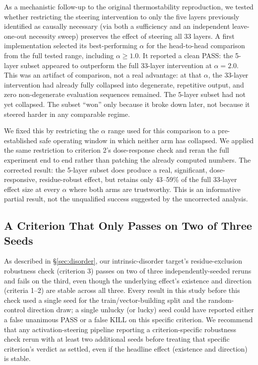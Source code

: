 \documentclass{article}
\begin{document}
As a mechanistic follow-up to the original thermostability
reproduction, we tested whether restricting the steering intervention
to only the five layers previously identified as causally necessary
(via both a sufficiency and an independent leave-one-out necessity
sweep) preserves the effect of steering all 33 layers. A first
implementation selected its best-performing $\alpha$ for the
head-to-head comparison from the full tested range, including $\alpha
\geq 1.0$. It reported a clean PASS: the 5-layer subset appeared to
outperform the full 33-layer intervention at $\alpha=2.0$. This was an
artifact of comparison, not a real advantage: at that $\alpha$, the
33-layer intervention had already fully collapsed into degenerate,
repetitive output, and zero non-degenerate evaluation sequences remained.
The 5-layer subset had not yet collapsed. The subset ``won'' only
because it broke down later, not because it steered harder in any
comparable regime.

We fixed this by restricting the $\alpha$ range used for this comparison
to a pre-established safe operating window in which neither arm has
collapsed. We applied the same restriction to criterion 2's dose-response
check and reran the full experiment end to end rather than patching the
already computed numbers. The corrected result: the 5-layer subset
does produce a real, significant, dose-responsive, residue-robust
effect, but retains only 43--59\% of the full 33-layer effect size at
every $\alpha$ where both arms are trustworthy. This is an informative
partial result, not the unqualified success suggested by the uncorrected
analysis.

\subsection{A Criterion That Only Passes on Two of Three Seeds}

As described in \S\ref{sec:disorder}, our intrinsic-disorder target's
residue-exclusion robustness check (criterion 3) passes on two of three
independently-seeded reruns and fails on the third, even though the
underlying effect's existence and direction (criteria 1--2) are stable
across all three. Every result in this study before this check used a
single seed for the train/vector-building split and the random-control
direction draw; a single unlucky (or lucky) seed could have reported
either a false unanimous PASS or a false KILL on this specific
criterion. We recommend that any activation-steering pipeline reporting
a criterion-specific robustness check rerun with at least two additional
seeds before treating that specific criterion's verdict as settled, even
if the headline effect (existence and direction) is stable.
\end{document}
